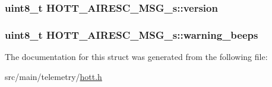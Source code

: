 \hypertarget{structHOTT__AIRESC__MSG__s_a508da3242c7574bdfb9f3049ae8700aa}{
\subsubsection[{version}]{\setlength{\rightskip}{0pt plus 5cm}uint8\+\_\+t H\+O\+T\+T\+\_\+\+A\+I\+R\+E\+S\+C\+\_\+\+M\+S\+G\+\_\+s\+::version}}\label{structHOTT__AIRESC__MSG__s_a508da3242c7574bdfb9f3049ae8700aa}
\hypertarget{structHOTT__AIRESC__MSG__s_aa3ffd7a6b09a92f9d7f6ce1ba4c71c95}{
\subsubsection[{warning\+\_\+beeps}]{\setlength{\rightskip}{0pt plus 5cm}uint8\+\_\+t H\+O\+T\+T\+\_\+\+A\+I\+R\+E\+S\+C\+\_\+\+M\+S\+G\+\_\+s\+::warning\+\_\+beeps}}\label{structHOTT__AIRESC__MSG__s_aa3ffd7a6b09a92f9d7f6ce1ba4c71c95}


The documentation for this struct was generated from the following file\+:\begin{DoxyCompactItemize}
\item 
src/main/telemetry/\hyperlink{telemetry_2hott_8h}{hott.\+h}\end{DoxyCompactItemize}
